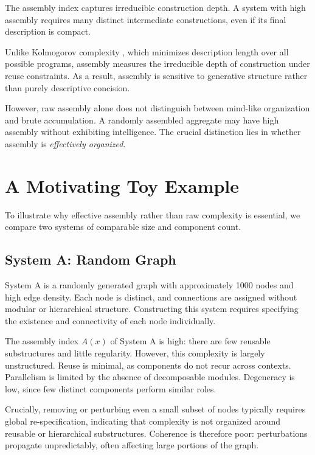 \documentclass[11pt,letterpaper]{article}
\begin{document}
The assembly index captures irreducible construction depth. A system with high assembly requires many distinct intermediate constructions, even if its final description is compact.

Unlike Kolmogorov complexity \parencite{kolmogorov1965}, which minimizes description length over all possible programs, assembly measures the irreducible depth of construction under reuse constraints. As a result, assembly is sensitive to generative structure rather than purely descriptive concision.

However, raw assembly alone does not distinguish between mind-like organization and brute accumulation. A randomly assembled aggregate may have high assembly without exhibiting intelligence. The crucial distinction lies in whether assembly is \emph{effectively organized}.

\section{A Motivating Toy Example}

To illustrate why effective assembly rather than raw complexity is essential, we compare two systems of comparable size and component count.

\subsection{System A: Random Graph}

System A is a randomly generated graph with approximately 1000 nodes and high edge density. Each node is distinct, and connections are assigned without modular or hierarchical structure. Constructing this system requires specifying the existence and connectivity of each node individually.

The assembly index $A(x)$ of System A is high: there are few reusable substructures and little regularity. However, this complexity is largely unstructured. Reuse is minimal, as components do not recur across contexts. Parallelism is limited by the absence of decomposable modules. Degeneracy is low, since few distinct components perform similar roles.

Crucially, removing or perturbing even a small subset of nodes typically requires global re-specification, indicating that complexity is not organized around reusable or hierarchical substructures. Coherence is therefore poor: perturbations propagate unpredictably, often affecting large portions of the graph.
\end{document}

